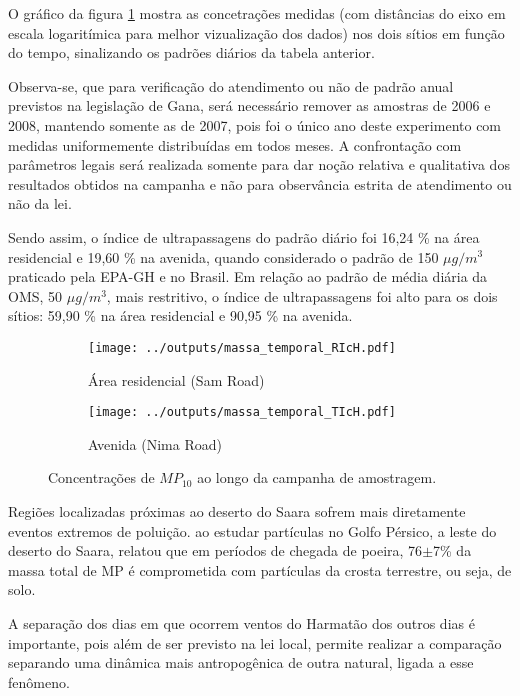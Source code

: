 O gráfico da figura \ref{fig:massa_temporal_mp10} mostra as concetrações medidas
(com distâncias do eixo em escala logaritímica para melhor vizualização dos 
dados) nos dois sítios em função do tempo, sinalizando os padrões diários 
da tabela anterior. 

Observa-se, que para verificação do atendimento ou não de padrão anual previstos
na legislação de Gana, será necessário remover as amostras de 2006 e 2008, 
mantendo somente as de 2007, pois foi o único ano deste experimento com medidas 
uniformemente distribuídas em todos meses. A confrontação com parâmetros legais 
será realizada somente para dar noção relativa e qualitativa dos resultados 
obtidos na campanha e não para observância estrita de atendimento ou não da lei.

Sendo assim, o índice de ultrapassagens do padrão diário foi 16,24 \% na área 
residencial e 19,60 \% na avenida, quando considerado o padrão de 150 
$\mu g / m^3$ praticado pela EPA-GH e no Brasil. Em relação
ao padrão de média diária da OMS, 50 $\mu g / m^3$, mais restritivo, 
o índice de ultrapassagens foi alto para os dois sítios: 59,90 \% 
na área residencial e 90,95 \% na avenida.

\begin{figure}[H]
  \centering
  \begin{subfigure}[b]{0.45\textwidth}
    \texttt{[image: ../outputs/massa\_temporal\_RIcH.pdf]}
    \caption{Área residencial (Sam Road)}
  \end{subfigure}%
  \begin{subfigure}[b]{0.45\textwidth}
    \texttt{[image: ../outputs/massa\_temporal\_TIcH.pdf]}
    \caption{Avenida (Nima Road)}
  \end{subfigure}
  \caption{Concentrações de $MP_{10}$ ao longo da campanha de amostragem.
           \label{fig:massa_temporal_mp10}}
\end{figure}

Regiões localizadas próximas ao deserto do Saara sofrem mais diretamente 
eventos extremos de poluição. \citet{kaku2016} ao estudar partículas no 
Golfo Pérsico, a leste do deserto do Saara, relatou que em períodos de chegada 
de poeira, 76$\pm$7\% da massa total de MP é comprometida com partículas da 
crosta terrestre, ou seja, de solo.

A separação dos dias em que ocorrem ventos do Harmatão dos outros dias é 
importante, pois além de ser previsto na lei local, permite realizar a 
comparação separando uma dinâmica mais antropogênica de outra natural, 
ligada a esse fenômeno.

